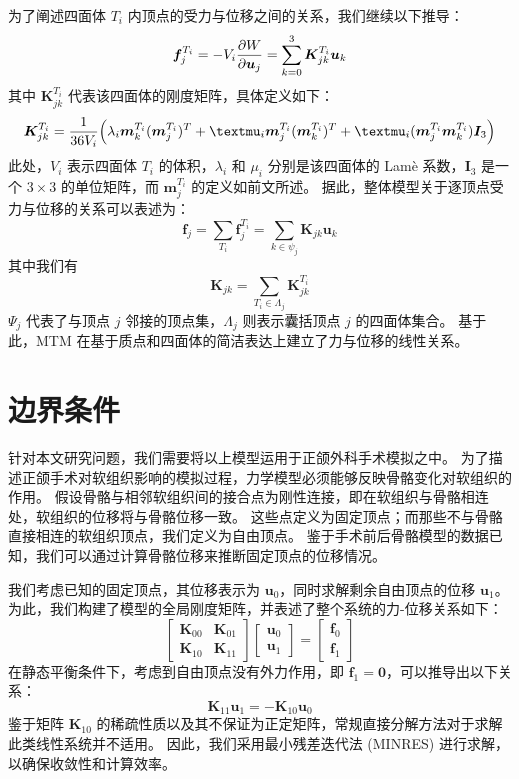 为了阐述四面体 $T_i$ 内顶点的受力与位移之间的关系，我们继续以下推导：
\begin{equation}
  \bm{f}_j^{T_i}
  = - V_i \pdv{W}{\bm{u}_j}
  = \sum_{k = 0}^3 \bm{K}_{jk}^{T_i} \bm{u}_k
\end{equation}
其中 $\bm{K}_{jk}^{T_i}$ 代表该四面体的刚度矩阵，具体定义如下：
\begin{equation}
  \bm{K}_{jk}^{T_i} = \frac{1}{36 V_i} \pqty{\lambda_i \bm{m}_k^{T_i} (\bm{m}_j^{T_i})^T + \mu_i \bm{m}_j^{T_i} (\bm{m}_k^{T_i})^T + \mu_i (\bm{m}_j^{T_i} \bm{m}_k^{T_i}) \bm{I}_3}
\end{equation}
此处，$V_i$ 表示四面体 $T_i$ 的体积，$\lambda_i$ 和 $\mu_i$ 分别是该四面体的 Lam\`e 系数，$\bm{I}_3$ 是一个 $3 \times 3$ 的单位矩阵，而 $\bm{m}_j^{T_i}$ 的定义如前文所述。
据此，整体模型关于逐顶点受力与位移的关系可以表述为：
\begin{equation}
  \bm{f}_j
  = \sum_{T_i} \bm{f}_j^{T_i}
  = \sum_{k \in \psi_j} \bm{K}_{jk} \bm{u}_k
\end{equation}
其中我们有
\begin{equation}
  \bm{K}_{jk} = \sum_{T_i \in \Lambda_j} \bm{K}_{jk}^{T_i}
\end{equation}
$\Psi_j$ 代表了与顶点 $j$ 邻接的顶点集，$\Lambda_j$ 则表示囊括顶点 $j$ 的四面体集合。
基于此，MTM 在基于质点和四面体的简洁表达上建立了力与位移的线性关系。

\section{边界条件}

针对本文研究问题，我们需要将以上模型运用于正颌外科手术模拟之中。
为了描述正颌手术对软组织影响的模拟过程，力学模型必须能够反映骨骼变化对软组织的作用。
假设骨骼与相邻软组织间的接合点为刚性连接，即在软组织与骨骼相连处，软组织的位移将与骨骼位移一致。
这些点定义为固定顶点；而那些不与骨骼直接相连的软组织顶点，我们定义为自由顶点。
鉴于手术前后骨骼模型的数据已知，我们可以通过计算骨骼位移来推断固定顶点的位移情况。

我们考虑已知的固定顶点，其位移表示为 $\bm{u}_0$，同时求解剩余自由顶点的位移 $\bm{u}_1$。
为此，我们构建了模型的全局刚度矩阵，并表述了整个系统的力-位移关系如下：
\begin{equation}
  \begin{bmatrix}
    \bm{K}_{00} & \bm{K}_{01} \\
    \bm{K}_{10} & \bm{K}_{11}
  \end{bmatrix}
  \begin{bmatrix}
    \bm{u}_0 \\
    \bm{u}_1
  \end{bmatrix}
  =
  \begin{bmatrix}
    \bm{f}_0 \\
    \bm{f}_1
  \end{bmatrix}
\end{equation}
在静态平衡条件下，考虑到自由顶点没有外力作用，即 $\bm{f}_1 = \bm{0}$，可以推导出以下关系：
\begin{equation}
  \bm{K}_{11} \bm{u}_1 = - \bm{K}_{10} \bm{u}_0
\end{equation}
鉴于矩阵 $\bm{K}_{10}$ 的稀疏性质以及其不保证为正定矩阵，常规直接分解方法对于求解此类线性系统并不适用。
因此，我们采用最小残差迭代法 (MINRES) 进行求解，以确保收敛性和计算效率。
